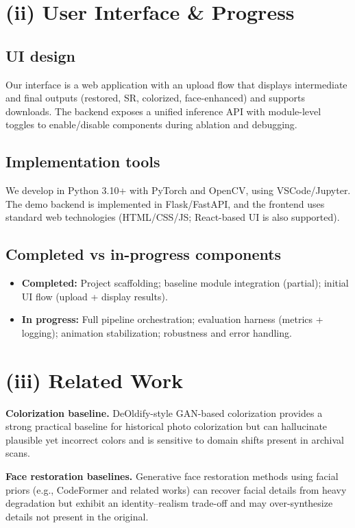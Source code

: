 \documentclass[10pt,twocolumn,letterpaper]{article}
\begin{document}
\section{(ii) User Interface \& Progress}
\subsection{UI design}
Our interface is a web application with an upload flow that displays intermediate and final outputs (restored, SR, colorized, face-enhanced) and supports downloads. The backend exposes a unified inference API with module-level toggles to enable/disable components during ablation and debugging.

\subsection{Implementation tools}
We develop in Python 3.10+ with PyTorch and OpenCV, using VSCode/Jupyter. The demo backend is implemented in Flask/FastAPI, and the frontend uses standard web technologies (HTML/CSS/JS; React-based UI is also supported).

\subsection{Completed vs in-progress components}
\begin{itemize}[leftmargin=*]
  \item \textbf{Completed:} Project scaffolding; baseline module integration (partial); initial UI flow (upload + display results).
  \item \textbf{In progress:} Full pipeline orchestration; evaluation harness (metrics + logging); animation stabilization; robustness and error handling.
\end{itemize}

\section{(iii) Related Work}
\textbf{Colorization baseline.} DeOldify-style GAN-based colorization provides a strong practical baseline for historical photo colorization but can hallucinate plausible yet incorrect colors and is sensitive to domain shifts present in archival scans.

\textbf{Face restoration baselines.} Generative face restoration methods using facial priors (e.g., CodeFormer and related works) can recover facial details from heavy degradation but exhibit an identity--realism trade-off and may over-synthesize details not present in the original.
\end{document}
